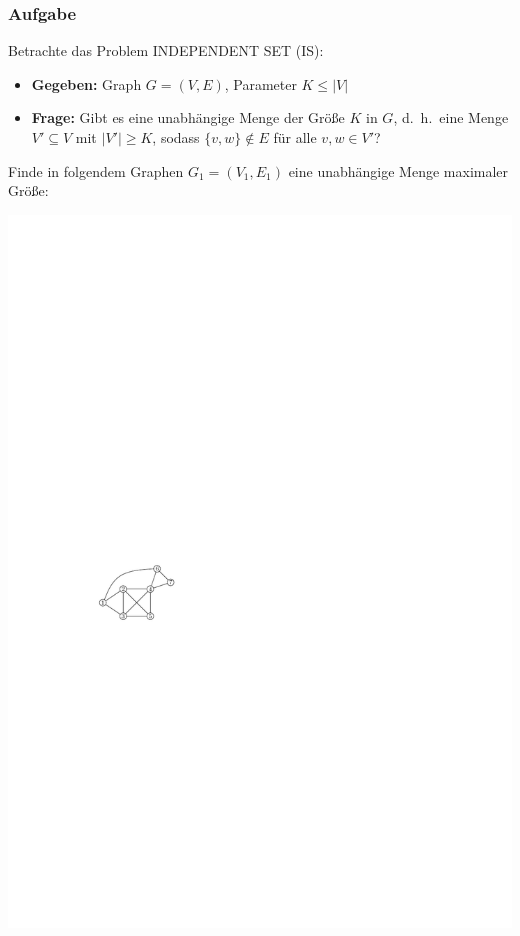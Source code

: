 \begin{frame}
\frametitle{Aufgabe}
Betrachte das Problem INDEPENDENT SET (IS):

\begin{itemize}
 \item \textbf{Gegeben:} Graph $G=(V, E)$, Parameter $K \leq |V|$
 \item \textbf{Frage:} Gibt es eine unabhängige Menge der Größe $K$ in $G$, d.~h.\  eine Menge $V' \subseteq V$ mit $|V'| \geq K$, sodass $\{v, w\} \notin E$ für alle $v, w \in V'$? 
\end{itemize}

 {

Finde in folgendem Graphen $G_1 = (V_1, E_1)$ eine unabhängige Menge maximaler Größe:

\begin{center}\includegraphics[scale=1.5]{images/tut7-graph}\end{center}

}
\end{frame}
